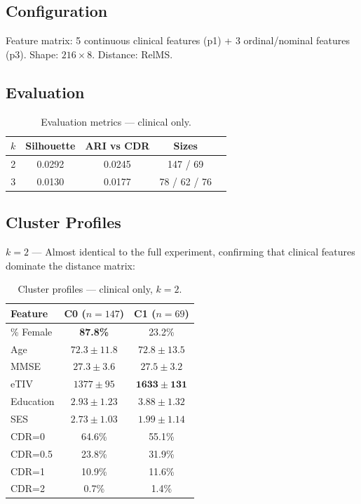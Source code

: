 \documentclass[12pt, a4paper]{article}
\begin{document}
\subsection{Configuration}
Feature matrix: 5 continuous clinical features (p1) + 3 ordinal/nominal features (p3).
Shape: $216 \times 8$. Distance: RelMS.

\subsection{Evaluation}

\begin{table}[H]
\centering
\caption{Evaluation metrics — clinical only.}
\begin{tabular}{ccccc}
\toprule
$k$ & \textbf{Silhouette} & \textbf{ARI vs CDR} & Sizes \\
\midrule
2 & 0.0292 & 0.0245 & 147 / 69 \\
3 & 0.0130 & 0.0177 & 78 / 62 / 76 \\
\bottomrule
\end{tabular}
\end{table}

\subsection{Cluster Profiles}

\textbf{$k=2$} — Almost identical to the full experiment, confirming that clinical features
dominate the distance matrix:

\begin{table}[H]
\centering
\caption{Cluster profiles — clinical only, $k=2$.}
\begin{tabular}{lcc}
\toprule
\textbf{Feature} & \textbf{C0 ($n=147$)} & \textbf{C1 ($n=69$)} \\
\midrule
\% Female & \textbf{87.8\%} & 23.2\% \\
Age & $72.3 \pm 11.8$ & $72.8 \pm 13.5$ \\
MMSE & $27.3 \pm 3.6$ & $27.5 \pm 3.2$ \\
eTIV & $1377 \pm 95$ & $\mathbf{1633 \pm 131}$ \\
Education & $2.93 \pm 1.23$ & $3.88 \pm 1.32$ \\
SES & $2.73 \pm 1.03$ & $1.99 \pm 1.14$ \\
\midrule
CDR=0 & 64.6\% & 55.1\% \\
CDR=0.5 & 23.8\% & 31.9\% \\
CDR=1 & 10.9\% & 11.6\% \\
CDR=2 & 0.7\% & 1.4\% \\
\bottomrule
\end{tabular}
\end{table}
\end{document}
